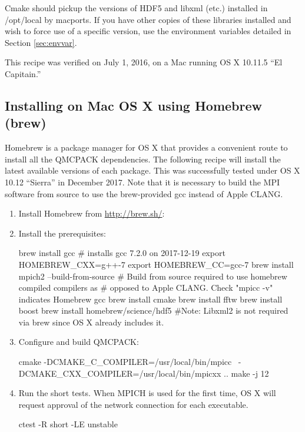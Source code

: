 Cmake should pickup the versions of HDF5 and libxml (etc.) installed in
/opt/local by macports. If you have other copies of these libraries
installed and wish to force use of a specific version, use the
environment variables detailed in Section \ref{sec:envvar}.

This recipe was verified on July 1, 2016, on a Mac running OS X 10.11.5
``El Capitain.''

\subsection{Installing on Mac OS X using Homebrew (brew)}
Homebrew is a package manager for OS X that provides a convenient
route to install all the QMCPACK dependencies. The
following recipe will install the latest available versions of each
package. This was successfully tested under OS X 10.12 ``Sierra'' in December 2017. Note that it is necessary to build the MPI software from
source to use the brew-provided gcc instead of Apple CLANG.

\begin{enumerate}
\item Install Homebrew from \url{http://brew.sh/}:
%
 
\item Install the prerequisites:
%
\begin{shade}
brew install gcc # installs gcc 7.2.0 on 2017-12-19
export HOMEBREW_CXX=g++-7
export HOMEBREW_CC=gcc-7
brew install mpich2 --build-from-source
# Build from source required to use homebrew compiled compilers as
# opposed to Apple CLANG. Check "mpicc -v" indicates Homebrew gcc
brew install cmake
brew install fftw
brew install boost
brew install homebrew/science/hdf5
#Note: Libxml2 is not required via brew since OS X already includes it.
\end{shade}
\item Configure and build QMCPACK:
%
\begin{shade}
cmake -DCMAKE_C_COMPILER=/usr/local/bin/mpicc \
      -DCMAKE_CXX_COMPILER=/usr/local/bin/mpicxx ..
make -j 12
\end{shade}
\item Run the short tests. When MPICH is used for the first time, OS
  X will request approval of the network connection for each executable.
%
\begin{shade}
ctest -R short -LE unstable
\end{shade}
\end{enumerate}

